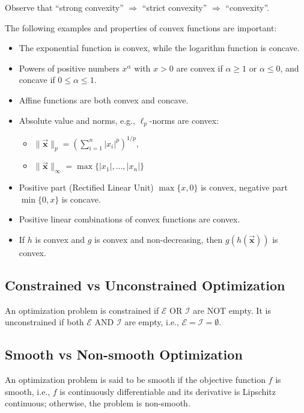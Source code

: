 \documentclass[9pt, headings=standardclasses, parskip=half]{scrartcl}
\renewcommand{\emph}[1]{\textcolor{mypurple}{#1}}
\newcommand{\vect}[1]{\vec{\boldsymbol{#1}}}
\begin{document}
Observe that ``strong convexity'' $\Longrightarrow$ ``strict convexity'' $\Longrightarrow$ ``convexity''.

\begin{example}
The following examples and properties of convex functions are important:
\begin{itemize}
\item The exponential function is convex, while the logarithm function is concave. 
\item Powers of positive numbers $x^{\alpha}$ with $x>0$ are convex if $\alpha \geq 1$ or $\alpha \leq 0$, and concave if $0 \leq \alpha \leq 1$.
\item Affine functions are both convex and concave.
\item Absolute value and norms, e.g., $\ell_p$-norms are convex:
\begin{itemize}
  \item $\| \vect{x}\|_{p} = \left(\sum_{i=1}^{n}|x_{i}|^{p}\right)^{1/p}$,
  \item $\| \vect{x}\|_{\infty}=\max\{|x_{1}|,\dots,|x_{n}|\}$
\end{itemize}
\item Positive part (Rectified Linear Unit) $\max\{x, 0\}$ is convex, negative part $\min\{0,x\}$ is concave.
\item Positive linear combinations of convex functions are convex.
\item If \(h\) is convex and \(g\) is convex and non-decreasing, then \(g\left(h(\vect{x})\right)\) is convex.
\end{itemize}
\end{example}

\subsection{Constrained vs Unconstrained Optimization}

An optimization problem is \emph{constrained} if \(\mathcal{E}\) OR \(\mathcal{I}\) are NOT empty. It is \emph{unconstrained} if both \(\mathcal{E}\) AND \(\mathcal{I}\) are empty, i.e., \(\mathcal{E}=\mathcal{I}=\emptyset\).

\subsection{Smooth vs Non-smooth Optimization}
\label{subsec:smooth_non_smooth}
An optimization problem is said to be \emph{smooth} if the objective function \(f\) is smooth, i.e., $f$ is continuously differentiable and its derivative is Lipschitz continuous; otherwise, the problem is \emph{non-smooth}. 
\end{document}
